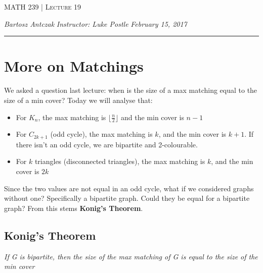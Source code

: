 \documentclass{report}
\newcommand{\lectureNum}{19}
\newcommand{\curDate}{February 15, 2017}
\newcommand{\course}{MATH 239}
\newcommand{\instructor}{Luke Postle}
\begin{document}
\begin{center}
\begin{Large}
\textsc{\course{} | Lecture \lectureNum{}}
\end{Large}
\end{center} 
\noindent \textit{Bartosz Antczak} \hfill
\textit{Instructor: \instructor{}} \hfill
\textit{\curDate{}}
\rule{\textwidth}{0.4pt}
\section{More on Matchings}
We asked a question last lecture: when is the size of a max matching equal to the size of a min cover? Today we will analyse that:
\begin{itemize}
\item For $K_n$, the max matching is $\lfloor \frac{n}{2}\rfloor$ and the min cover is $n-1$
\item For $C_{2k+1}$ (odd cycle), the max matching is $k$, and the min cover is $k+1$. If there isn't an odd cycle, we are bipartite and 2-colourable.
\item For $k$ triangles (disconnected triangles), the max matching is $k$, and the min cover is $2k$
\end{itemize}
Since the two values are not equal in an odd cycle, what if we considered graphs without one? Specifically a bipartite graph. Could they be equal for a bipartite graph? From this stems \textbf{Konig's Theorem}.
\subsection{Konig's Theorem}
\begin{center}
\textit{If G is bipartite, then the size of the max matching of G is equal to the size of the min cover}
\end{center}
\end{document}
